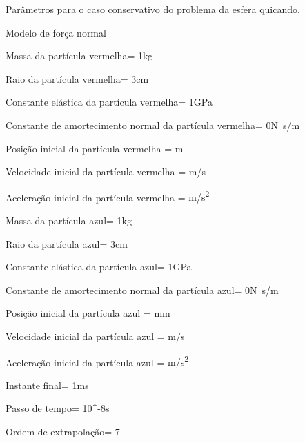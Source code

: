 \begin{table}[h]
\centering
\caption{Parâmetros para o caso conservativo do problema da esfera quicando.}
\label{tab:colliding_spheres:conservative:parameters}
\begin{parametersdesc}
	\item{Modelo de força normal}{}{\emptyUnit}
	\hline
	\item{Massa da partícula vermelha}{\redMass = 1}{\si\kilogram}
	\item{Raio da partícula vermelha}{\redRadius = 3}{\si\centi\metre}
	\item{Constante elástica da partícula vermelha}{\redElasticModulus = 1}{\si[per-mode=symbol]{\giga\pascal}}
	\item{Constante de amortecimento normal da partícula vermelha}{\redNormalDampingConstant = 0}{\si[per-mode=symbol]{\newton\second\per\meter}}
	\hline
	\item{Posição inicial da partícula vermelha}{\initial{\redPosition} = }{\si{\metre}}
	\item{Velocidade inicial da partícula vermelha}{\initial{\redVelocity} = }{\si[per-mode=symbol]{\metre\per\second}}
	\item{Aceleração inicial da partícula vermelha}{\initial{\redAcceleration} = }{\si[per-mode=symbol]{\metre\per\square\second}}
	\hline
	\item{Massa da partícula azul}{\blueMass = 1}{\si\kilogram}
	\item{Raio da partícula azul}{\blueRadius = 3}{\si\centi\metre}
	\item{Constante elástica da partícula azul}{\blueElasticModulus = 1}{\si[per-mode=symbol]{\giga\pascal}}
	\item{Constante de amortecimento normal da partícula azul}{\blueNormalDampingConstant = 0}{\si[per-mode=symbol]{\newton\second\per\meter}}
	\hline
	\item{Posição inicial da partícula azul}{\initial{\bluePosition} = }{\si{\milli\metre}}
	\item{Velocidade inicial da partícula azul}{\initial{\blueVelocity} = }{\si[per-mode=symbol]{\metre\per\second}}
	\item{Aceleração inicial da partícula azul}{\initial{\blueAcceleration} = }{\si[per-mode=symbol]{\metre\per\square\second}}
	\hline
	\item{Instante final}{\finalInstant = 1}{\si\milli\second} 
	\item{Passo de tempo}{\Dt = 10^{-8}}{\si\second}
	\item{Ordem de extrapolação}{\taylorOrder = 7}{\emptyUnit}
\end{parametersdesc}
\sourceMe 
\end{table}

